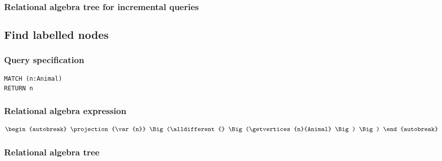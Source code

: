 \subsubsection*{Relational algebra tree for incremental queries}


\subsection{Find labelled nodes}

\subsubsection*{Query specification}

\begin{lstlisting}
MATCH (n:Animal)
RETURN n
\end{lstlisting}

\subsubsection*{Relational algebra expression}

\begin{align*}
\begin{autobreak}
\projection{\var{n}} \Big(\alldifferent{} \Big(\getvertices{n}{Animal}
\Big)
\Big)
\end{autobreak}
\end{align*}

\subsubsection*{Relational algebra tree}


